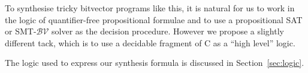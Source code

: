 To synthesise tricky bitvector programs like this, it is natural for us to
work in the logic of quantifier-free propositional formulae and to use a
propositional SAT or SMT-$\mathcal{BV}$ solver as the decision procedure. 
However we propose a slightly different tack, which is to use a decidable
fragment of C as a ``high level'' logic.
\fi


The logic used to express our synthesis formula is \newC discussed in Section~\ref{sec:logic}.


  
  






